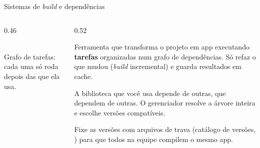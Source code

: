 \begin{frame}{Sistemas de \emph{build} e dependências}
  \begin{columns}[c]
    \begin{column}{0.46\textwidth}
      \centering
      \\[2pt]
      {\tiny Grafo de tarefas: cada uma só roda depois das que ela usa.}
    \end{column}
    \begin{column}{0.52\textwidth}
      \begin{definicao}
        Ferramenta que transforma o projeto em app executando \textbf{tarefas} organizadas num grafo de dependências. Só refaz o que mudou (\emph{build} incremental) e guarda resultados em cache.
      \end{definicao}
      \begin{definicao}
        A biblioteca que você usa depende de outras, que dependem de outras. O gerenciador resolve a árvore inteira e escolhe versões compatíveis.
      \end{definicao}
      \begin{atencao}
        Fixe as versões com arquivos de trava (catálogo de versões, ) para que todos na equipe compilem o mesmo app.
      \end{atencao}
    \end{column}
  \end{columns}
\end{frame}

